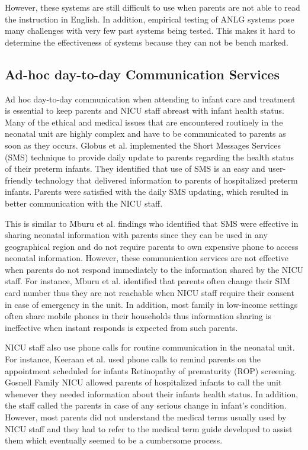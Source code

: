 However, these systems are still difficult to use when parents are not able to read the instruction in English. In addition, empirical testing of ANLG systems pose many challenges with very few past systems being tested. This makes it hard to determine the effectiveness of systems  because they can not be bench marked. 

\subsection{Ad-hoc day-to-day Communication Services}
 Ad hoc day-to-day communication when attending to infant care and treatment is essential to keep parents and NICU staff abreast with infant health status. Many of the ethical and medical issues that are encountered routinely in the neonatal unit are highly complex and have to be communicated to parents as soon as they occurs. 
 Globus et al. \citep{Globus2016} implemented the Short Messages Services (SMS) technique to provide daily update to parents regarding the health status of their preterm infants. They identified that use of SMS is an easy and user-friendly technology that delivered information to parents of hospitalized preterm infants. Parents were satisfied with the daily SMS updating, which resulted in better communication with the NICU staff. 
 
 This is similar to  Mburu et al. \citep{Mburu2018a} findings who identified that SMS were effective in sharing neonatal information with parents since they can be used in any geographical region and do not require parents to own expensive phone to access neonatal information. However, these communication services are not effective when parents do not respond immediately to the information shared by the NICU staff. For instance, Mburu et al. \citep{Mburu2018a} identified that parents often change their SIM card number thus they are not reachable when NICU staff require their consent in case of emergency in the unit. In addition, most family in low-income settings often share mobile phones in their households thus information sharing is ineffective when instant responds is expected from such parents.
 
 NICU staff also use phone calls for routine communication in the neonatal unit. For instance, Keeraan et al. \citep{Keraan2017} used phone calls to remind parents on the appointment scheduled for infants Retinopathy of prematurity (ROP) screening. Gosnell Family NICU \citep{UniversityofRochestermedicalSchool2019} allowed parents of hospitalized infants to call the unit whenever they needed information about their infants health status. In addition, the staff called the parents in case of any serious change in infant's condition. However, most parents did not understand the medical terms usually used by NICU staff and they had to refer to the medical term guide developed to assist them which eventually seemed to be a cumbersome process.
 

